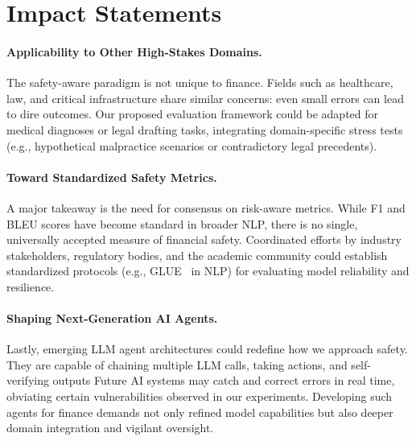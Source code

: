 \newpage
\section*{Impact Statements}

\paragraph{Applicability to Other High-Stakes Domains.}
The safety-aware paradigm is not unique to finance. Fields such as healthcare, law, and critical infrastructure share similar concerns: even small errors can lead to dire outcomes. Our proposed evaluation framework could be adapted for medical diagnoses or legal drafting tasks, integrating domain-specific stress tests (e.g., hypothetical malpractice scenarios or contradictory legal precedents).

\paragraph{Toward Standardized Safety Metrics.}
A major takeaway is the need for consensus on risk-aware metrics. While F1 and BLEU scores have become standard in broader NLP, there is no single, universally accepted measure of financial safety. Coordinated efforts by industry stakeholders, regulatory bodies, and the academic community could establish standardized protocols (e.g., \textsc{GLUE}~\citep{wang2018glue} in NLP) for evaluating model reliability and resilience.

\paragraph{Shaping Next-Generation AI Agents.}
Lastly, emerging LLM agent architectures could redefine how we approach safety. They are capable of chaining multiple LLM calls, taking actions, and self-verifying outputs
Future AI systems may catch and correct errors in real time, obviating certain vulnerabilities observed in our experiments. Developing such agents for finance demands not only refined model capabilities but also deeper domain integration and vigilant oversight.
